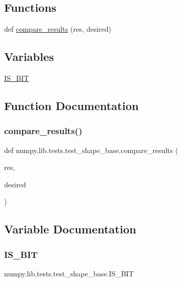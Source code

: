 \subsection*{Functions}
\begin{DoxyCompactItemize}
\item 
def \hyperlink{namespacenumpy_1_1lib_1_1tests_1_1test__shape__base_a6defc8576f81029cf171ec109993b29a}{compare\+\_\+results} (res, desired)
\end{DoxyCompactItemize}
\subsection*{Variables}
\begin{DoxyCompactItemize}
\item 
\hyperlink{namespacenumpy_1_1lib_1_1tests_1_1test__shape__base_a2f764ae233fc181e4183f40cf2c6fb05}{I\+S\+\_\+B\+IT}
\end{DoxyCompactItemize}


\subsection{Function Documentation}
\mbox{\label{namespacenumpy_1_1lib_1_1tests_1_1test__shape__base_a6defc8576f81029cf171ec109993b29a}} 
\subsubsection{\texorpdfstring{compare\+\_\+results()}{compare\_results()}}
{\footnotesize\ttfamily def numpy.\+lib.\+tests.\+test\+\_\+shape\+\_\+base.\+compare\+\_\+results (\begin{DoxyParamCaption}\item[{}]{res,  }\item[{}]{desired }\end{DoxyParamCaption})}



\subsection{Variable Documentation}
\mbox{\label{namespacenumpy_1_1lib_1_1tests_1_1test__shape__base_a2f764ae233fc181e4183f40cf2c6fb05}} 
\subsubsection{\texorpdfstring{I\+S\+\_\+B\+IT}{IS\_64BIT}}
{\footnotesize\ttfamily numpy.\+lib.\+tests.\+test\+\_\+shape\+\_\+base.\+I\+S\+\_\+B\+IT}

